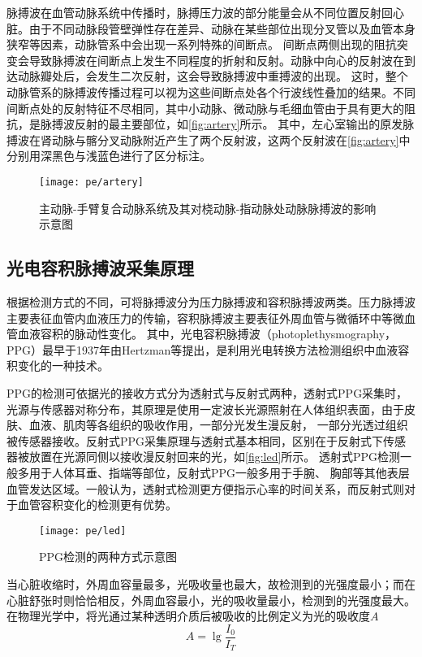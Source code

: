 脉搏波在血管动脉系统中传播时，脉搏压力波的部分能量会从不同位置反射回心脏。由于不同动脉段管壁弹性存在差异、动脉在某些部位出现分叉管以及血管本身狭窄等因素，动脉管系中会出现一系列特殊的间断点。
间断点两侧出现的阻抗突变会导致脉搏波在间断点上发生不同程度的折射和反射。动脉中向心的反射波在到达动脉瓣处后，会发生二次反射，这会导致脉搏波中重搏波的出现。
这时，整个动脉管系的脉搏波传播过程可以视为这些间断点处各个行波线性叠加的结果\cite{THOCBPM}。不同间断点处的反射特征不尽相同，其中小动脉、微动脉与毛细血管由于具有更大的阻抗，是脉搏波反射的最主要部位，如\autoref{fig:artery}所示。
其中，左心室输出的原发脉搏波在肾动脉与髂分叉动脉附近产生了两个反射波，这两个反射波在\autoref{fig:artery}中分别用深黑色与浅蓝色进行了区分标注。
\begin{figure}[htbp]
    \centering
    \texttt{[image: pe/artery]}
    \caption[主动脉-手臂复合动脉系统及其对桡动脉-指动脉处动脉脉搏波的影响示意图]{\label{fig:artery}主动脉-手臂复合动脉系统及其对桡动脉-指动脉处动脉脉搏波的影响示意图\cite{THOCBPM}}
\end{figure}

\subsection{光电容积脉搏波采集原理}
根据检测方式的不同，可将脉搏波分为压力脉搏波和容积脉搏波两类。压力脉搏波主要表征血管内血液压力的传输，容积脉搏波主要表征外周血管与微循环中等微血管血液容积的脉动性变化。
其中，光电容积脉搏波（photoplethysmography，PPG）最早于1937年由Hertzman等\cite{Hertzman1937}提出，是利用光电转换方法检测组织中血液容积变化的一种技术。

PPG的检测可依据光的接收方式分为透射式与反射式两种\cite{THOCBPM}，透射式PPG采集时，光源与传感器对称分布，其原理是使用一定波长光源照射在人体组织表面，由于皮肤、血液、肌肉等各组织的吸收作用，一部分光发生漫反射，
一部分光透过组织被传感器接收。反射式PPG采集原理与透射式基本相同，区别在于反射式下传感器被放置在光源同侧以接收漫反射回来的光\cite{THOCBPM,mmt}，如\autoref{fig:led}所示。
透射式PPG检测一般多用于人体耳垂、指端等部位，反射式PPG一般多用于手腕、
胸部等其他表层血管发达区域\cite{THOCBPM}。一般认为，透射式检测更方便指示心率的时间关系，而反射式则对于血管容积变化的检测更有优势\cite{mmt}。
\begin{figure}[htbp]
    \centering
    \texttt{[image: pe/led]}
    \caption[PPG检测的两种方式示意图]{\label{fig:led}PPG检测的两种方式示意图\cite{THOCBPM}}
\end{figure}

当心脏收缩时，外周血容量最多，光吸收量也最大，故检测到的光强度最小；而在心脏舒张时则恰恰相反，外周血容最小，光的吸收量最小，检测到的光强度最大\cite{lhc}。
在物理光学中，将光通过某种透明介质后被吸收的比例定义为光的吸收度$A$
\begin{equation}
    \label{equ:LBL}
    A=\lg\frac{I_{0}}{I_{T}}
\end{equation}

